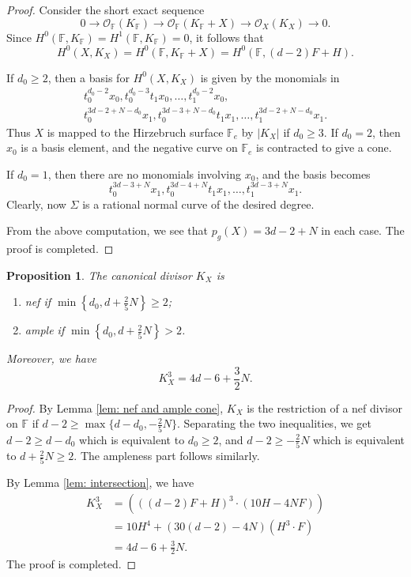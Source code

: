 \documentclass[a4paper,11pt]{amsart}
\newcommand{\FF}{\ensuremath{\mathbb{F}}}
\newtheorem{prop}[thm]{Proposition}
\theoremstyle{definition}
\theoremstyle{remark}
\numberwithin{equation}{section}
\begin{document}
\begin{proof}
	Consider the short exact sequence
	$$
	0 \to \mathcal{O}_\FF (K_\FF) \to \mathcal{O}_\FF (K_\FF + X) \to \mathcal{O}_X (K_X) \to 0.
	$$
	Since $H^0(\FF, K_\FF) = H^1(\FF, K_\FF) = 0$, it follows that 
	$$
	H^0(X, K_X) = H^0(\FF, K_\FF + X) = H^0 \left(\FF, (d-2)F + H\right).
	$$
	
	If $d_0 \ge 2$, then a basis for $H^0(X, K_X)$ is given by the monomials in 
	\begin{multline*}
		t_0^{d_0-2}x_0, t_0^{d_0-3}t_1x_0, \ldots, t_1^{d_0-2}x_0, \\
		t_0^{3d-2+N-d_0}x_1, t_0^{3d-3+N-d_0}t_1x_1, \ldots, t_1^{3d-2+N-d_0}x_1.
	\end{multline*}
	Thus $X$ is mapped to the Hirzebruch surface $\mathbb{F}_e$ by $|K_X|$ if $d_0 \ge 3$. If $d_0 = 2$, then $x_0$ is a basis element, and the negative curve on $\mathbb{F}_e$ is contracted to give a cone.
	
	If $d_0=1$, then there are no monomials involving $x_0$, and the basis becomes
	$$
	t_0^{3d-3+N}x_1, t_0^{3d-4+N}t_1x_1, \ldots, t_1^{3d-3+N}x_1.
	$$
	Clearly, now $\Sigma$ is a rational normal curve of the desired degree.
	
	From the above computation, we see that $p_g(X) = 3d - 2 + N$ in each case. The proof is completed.
\end{proof}

\begin{prop} \label{prop: KX-nef} 
	The canonical divisor $K_X$ is
	\begin{enumerate}
		\item nef if $\min \left\{d_0, d + \frac25N\right\} \ge 2$;
		\item ample if $\min\left\{d_0, d + \frac25N\right\} > 2$.
	\end{enumerate}
	Moreover, we have
	$$
	K_X^3 = 4d - 6 + \frac32N.
	$$
\end{prop}

\begin{proof}
	By Lemma \ref{lem: nef and ample cone}, $K_X$ is the restriction of a nef divisor on $\FF$ if $d-2\ge\max\{d-d_0,-\frac25N\}$. Separating the two inequalities, we get $d-2 \ge d-d_0$ which is equivalent to $d_0 \ge 2$, and $d-2 \ge - \frac25N$ which is equivalent to $d + \frac25N \ge 2$. The ampleness part follows similarly. 
	
	By Lemma \ref{lem: intersection}, we have
	\begin{align*}
		K_X^3 & = \left( \left((d-2)F + H\right)^3 \cdot (10H - 4NF)\right) \\
		& = 10H^4 + \left(30(d - 2) - 4N\right) (H^3 \cdot F) \\
		& = 4d - 6 + \frac{3}{2}N.
	\end{align*}
	The proof is completed.
\end{proof}
\end{document}
